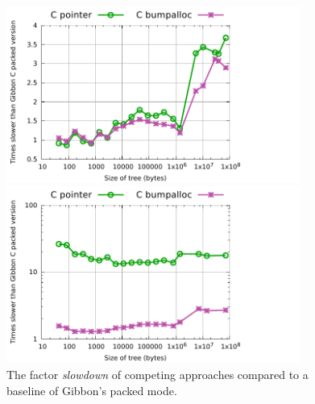 \documentclass[a4paper,english]{lipics-v2016}
\newcommand{\treelang}{Gibbon\xspace} %
\begin{document}


\begin{figure}[t]
  \hspace{-5mm}
  \begin{minipage}{1.04\textwidth}
    \begin{minipage}{.49\textwidth}
      \centering
      \includegraphics[width=3.8in]{./figs/slowdown_countnodes.pdf}
    \end{minipage}
    \begin{minipage}{.49\textwidth}
      \includegraphics[width=3.8in]{./figs/slowdown_treewalk.pdf}
    \end{minipage}
  \end{minipage}
  \caption{The factor {\em slowdown} of competing approaches compared to a
    baseline of Gibbon's packed mode.}
  \label{fig:slowdown}
\end{figure}
      
\end{document}
